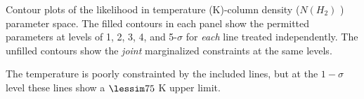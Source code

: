 Contour plots of the likelihood in temperature (K)-column
density ($N(H_2)$ \persc) parameter space.  The filled contours in each panel
show the permitted parameters at levels of 1, 2, 3, 4, and 5-$\sigma$ for
\emph{each} line treated independently.  The unfilled contours show the
\emph{joint} marginalized constraints at the same levels.

The temperature is poorly constrainted by the included \cyano lines, but at the
$1-\sigma$ level these lines show a $\lessim75$ K upper limit.
